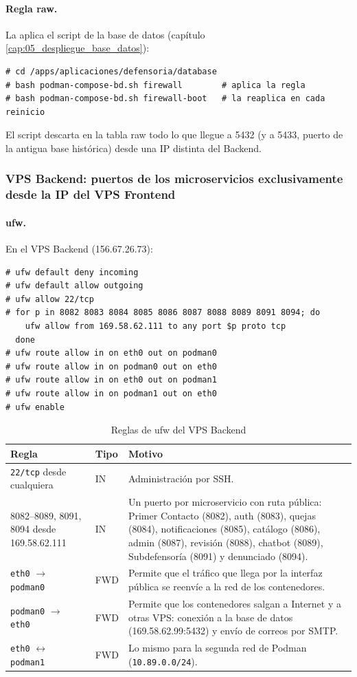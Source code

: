 \paragraph{Regla raw.} La aplica el script de la base de datos (capítulo \ref{cap:05_despliegue_base_datos}):
\begin{lstlisting}
# cd /apps/aplicaciones/defensoria/database
# bash podman-compose-bd.sh firewall        # aplica la regla
# bash podman-compose-bd.sh firewall-boot   # la reaplica en cada reinicio
\end{lstlisting}
El script descarta en la tabla raw todo lo que llegue a 5432 (y a 5433, puerto de la antigua base histórica) desde una IP distinta del Backend.

\subsubsection{VPS Backend: puertos de los microservicios exclusivamente desde la IP del VPS Frontend}
\paragraph{ufw.} En el VPS Backend (156.67.26.73):
\begin{lstlisting}
# ufw default deny incoming
# ufw default allow outgoing
# ufw allow 22/tcp
# for p in 8082 8083 8084 8085 8086 8087 8088 8089 8091 8094; do
    ufw allow from 169.58.62.111 to any port $p proto tcp
  done
# ufw route allow in on eth0 out on podman0
# ufw route allow in on podman0 out on eth0
# ufw route allow in on eth0 out on podman1
# ufw route allow in on podman1 out on eth0
# ufw enable
\end{lstlisting}
\begin{table}[H]
\centering
\caption{Reglas de ufw del VPS Backend}
\small
\begin{tabular}{p{5.2cm}p{1.4cm}p{7.8cm}}
\toprule
\textbf{Regla} & \textbf{Tipo} & \textbf{Motivo} \\
\midrule
\texttt{22/tcp} desde cualquiera & IN & Administración por SSH. \\
8082--8089, 8091, 8094 desde 169.58.62.111 & IN & Un puerto por microservicio con ruta pública: Primer Contacto (8082), auth (8083), quejas (8084), notificaciones (8085), catálogo (8086), admin (8087), revisión (8088), chatbot (8089), Subdefensoría (8091) y denunciado (8094). \\
\texttt{eth0} $\rightarrow$ \texttt{podman0} & FWD & Permite que el tráfico que llega por la interfaz pública se reenvíe a la red de los contenedores. \\
\texttt{podman0} $\rightarrow$ \texttt{eth0} & FWD & Permite que los contenedores salgan a Internet y a otras VPS: conexión a la base de datos (169.58.62.99:5432) y envío de correos por SMTP. \\
\texttt{eth0} $\leftrightarrow$ \texttt{podman1} & FWD & Lo mismo para la segunda red de Podman (\texttt{10.89.0.0/24}). \\
\bottomrule
\end{tabular}
\end{table}

